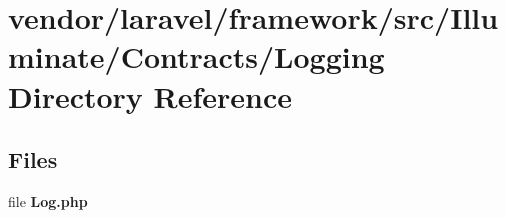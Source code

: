 \section{vendor/laravel/framework/src/\+Illuminate/\+Contracts/\+Logging Directory Reference}
\label{dir_9ea2700f8ba905a72cd39f3ac015b652}
\subsection*{Files}
\begin{DoxyCompactItemize}
\item 
file {\bf Log.\+php}
\end{DoxyCompactItemize}
